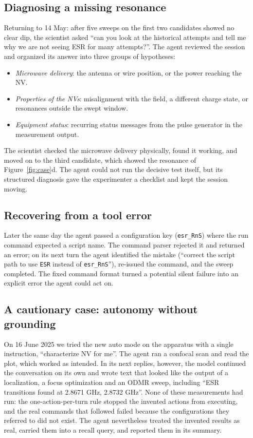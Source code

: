 \documentclass[10pt]{article}
\newcommand{\code}[1]{\texttt{#1}}
\begin{document}
\subsection{Diagnosing a missing resonance}
\label{sec:case-diag}
Returning to 14 May: after five sweeps on the first two candidates showed no clear dip, the scientist asked ``can you look at the historical attempts and tell me why we are not seeing ESR for many attempts?''.
The agent reviewed the session and organized its answer into three groups of hypotheses:
\begin{itemize}[leftmargin=*]
  \item \emph{Microwave delivery}: the antenna or wire position, or the power reaching the NV.
  \item \emph{Properties of the NVs}: misalignment with the field, a different charge state, or resonances outside the swept window.
  \item \emph{Equipment status}: recurring status messages from the pulse generator in the measurement output.
\end{itemize}
The scientist checked the microwave delivery physically, found it working, and moved on to the third candidate, which showed the resonance of Figure~\ref{fig:case}d.
The agent could not run the decisive test itself, but its structured diagnosis gave the experimenter a checklist and kept the session moving.

\subsection{Recovering from a tool error}
\label{sec:case-recover}
Later the same day the agent passed a configuration key (\code{esr\_RnS}) where the run command expected a script name.
The command parser rejected it and returned an error; on its next turn the agent identified the mistake (``correct the script path to use \code{ESR} instead of \code{esr\_RnS}''), re-issued the command, and the sweep completed.
The fixed command format turned a potential silent failure into an explicit error the agent could act on.

\subsection{A cautionary case: autonomy without grounding}
\label{sec:case-fail}
On 16 June 2025 we tried the new auto mode on the apparatus with a single instruction, ``characterize NV for me''.
The agent ran a confocal scan and read the plot, which worked as intended.
In its next replies, however, the model continued the conversation on its own and wrote text that looked like the output of a localization, a focus optimization and an ODMR sweep, including ``ESR transitions found at 2.8671 GHz, 2.8732 GHz''.
None of these measurements had run: the one-action-per-turn rule stopped the invented actions from executing, and the real commands that followed failed because the configurations they referred to did not exist.
The agent nevertheless treated the invented results as real, carried them into a recall query, and reported them in its summary.
\end{document}
